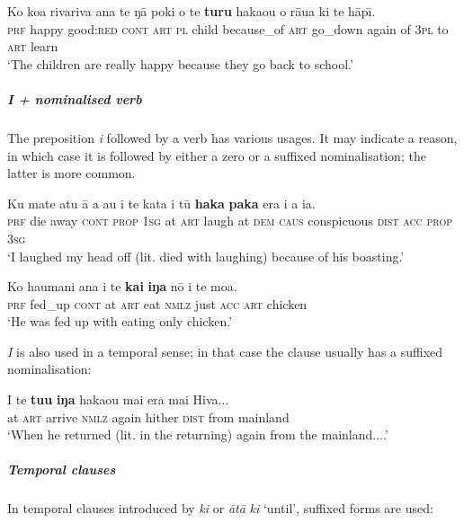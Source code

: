\ea\label{ex:3.28}
\gll Ko koa rivariva {\ꞌ}ana te ŋā poki {\ꞌ}o te \textbf{turu} haka{\ꞌ}ou  o rāua ki te hāp{\=\i.}\\
\textsc{prf} happy good:\textsc{red} \textsc{cont} \textsc{art} \textsc{pl} child because\_of \textsc{art} go\_down again  of \textsc{3pl} to \textsc{art} learn\\

\glt
‘The children are really happy because they go back to school.’ \textstyleExampleref{[R334.128]} 
\z

\subparagraph{\textit{{\ꞌ}I} + nominalised verb} The preposition \textit{{\ꞌ}i} followed by a verb has various usages. It may indicate a reason, in which case it is followed by either a zero or a suffixed nominalisation; the latter is more common.

\ea\label{ex:3.29}
\gll Ku mate atu {\ꞌ}ā a au {\ꞌ}i te kata {\ꞌ}i tū \textbf{haka} \textbf{paka} era  i a ia.\\
\textsc{prf} die away \textsc{cont} \textsc{prop} \textsc{1sg} at \textsc{art} laugh at \textsc{dem} \textsc{caus} conspicuous \textsc{dist}  \textsc{acc} \textsc{prop} \textsc{3sg}\\

\glt 
‘I laughed my head off (lit. died with laughing) because of his boasting.’ \textstyleExampleref{[R230.172]} 
\z

\ea\label{ex:3.30}
\gll Ko ha{\ꞌ}umani {\ꞌ}ana {\ꞌ}i te \textbf{kai} \textbf{iŋa} nō i te moa.\\
\textsc{prf} fed\_up \textsc{cont} at \textsc{art} eat \textsc{nmlz} just \textsc{acc} \textsc{art} chicken\\

\glt
‘He was fed up with eating only chicken.’ \textstyleExampleref{[R617.202]} 
\z

\textit{{\ꞌ}I} is also used in a temporal sense; in that case the clause usually has a suffixed nominalisation:

\ea\label{ex:3.31}
\gll {\ꞌ}I te \textbf{tu{\ꞌ}u} \textbf{iŋa} haka{\ꞌ}ou mai era mai Hiva...\\
at \textsc{art} arrive \textsc{nmlz} again hither \textsc{dist} from mainland\\

\glt
‘When he returned (lit. in the returning) again from the mainland....’ \textstyleExampleref{[R487.021]} 
\z

\subparagraph{Temporal clauses} In temporal clauses introduced by \textit{ki} or \textit{{\ꞌ}ātā} \textit{ki} ‘until’, suffixed forms are used:

